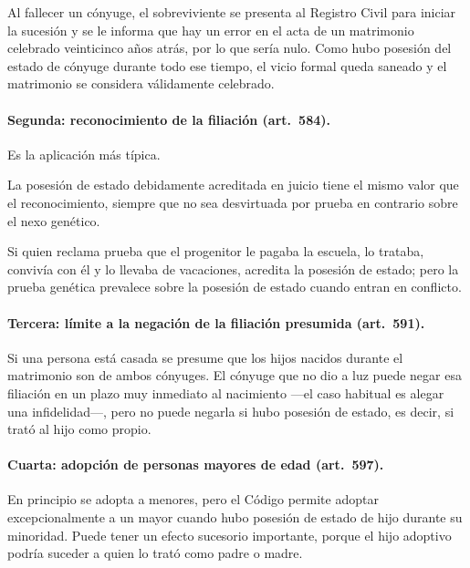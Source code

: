 \documentclass[12pt,oneside]{book}
\begin{document}
\begin{ejemplo}
Al fallecer un cónyuge, el sobreviviente se presenta al Registro Civil para iniciar la sucesión y se le informa que hay un error en el acta de un matrimonio celebrado veinticinco años atrás, por lo que sería nulo. Como hubo posesión del estado de cónyuge durante todo ese tiempo, el vicio formal queda saneado y el matrimonio se considera válidamente celebrado.
\end{ejemplo}

\paragraph{Segunda: reconocimiento de la filiación (art.~584).} Es la aplicación más típica.

\begin{regla}
La posesión de estado debidamente acreditada en juicio tiene el mismo valor que el reconocimiento, siempre que no sea desvirtuada por prueba en contrario sobre el nexo genético.
\end{regla}

Si quien reclama prueba que el progenitor le pagaba la escuela, lo trataba, convivía con él y lo llevaba de vacaciones, acredita la posesión de estado; pero la prueba genética prevalece sobre la posesión de estado cuando entran en conflicto.

\paragraph{Tercera: límite a la negación de la filiación presumida (art.~591).} Si una persona está casada se presume que los hijos nacidos durante el matrimonio son de ambos cónyuges. El cónyuge que no dio a luz puede negar esa filiación en un plazo muy inmediato al nacimiento ---el caso habitual es alegar una infidelidad---, pero no puede negarla si hubo posesión de estado, es decir, si trató al hijo como propio.

\paragraph{Cuarta: adopción de personas mayores de edad (art.~597).} En principio se adopta a menores, pero el Código permite adoptar excepcionalmente a un mayor cuando hubo posesión de estado de hijo durante su minoridad. Puede tener un efecto sucesorio importante, porque el hijo adoptivo podría suceder a quien lo trató como padre o madre.
\end{document}
